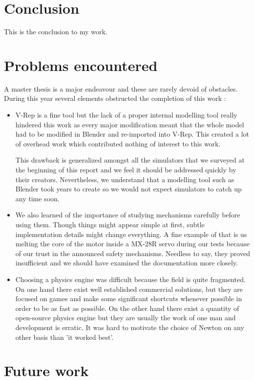\section{Conclusion}
This is the conclusion to my work.

\section{Problems encountered}
A master thesis is a major endeavour and these are rarely devoid of obstacles. During this year several elements obstructed the completion of this work : \begin{itemize}
\item V-Rep is a fine tool but the lack of a proper internal modelling tool really hindered this work as every major modification meant that the whole model had to be modified in Blender and re-imported into V-Rep. This created a lot of overhead work which contributed nothing of interest to this work. 

This drawback is generalized amongst all the simulators that we surveyed at the beginning of this report and we feel it should be addressed quickly by their creators. Nevertheless, we understand that a modelling tool such as Blender took years to create so we would not expect simulators to catch up any time soon.

\item We also learned of the importance of studying mechanisms carefully before using them. Though things might appear simple at first, subtle implementation details might change everything. A fine example of that is us melting the core of the motor inside a MX-28R servo during our tests because of our trust in the announced safety mechanisms. Needless to say, they proved insufficient and we should have examined the documentation more closely.

\item Choosing a physics engine was difficult because the field is quite fragmented. On one hand there exist well established commercial solutions, but they are focused on games and make some significant shortcuts whenever possible in order to be as fast as possible. On the other hand there exist a quantity of open-source physics engine but they are usually the work of one man and development is erratic. It was hard to motivate the choice of Newton on any other basis than 'it worked best'.
\end{itemize}


\section{Future work}
